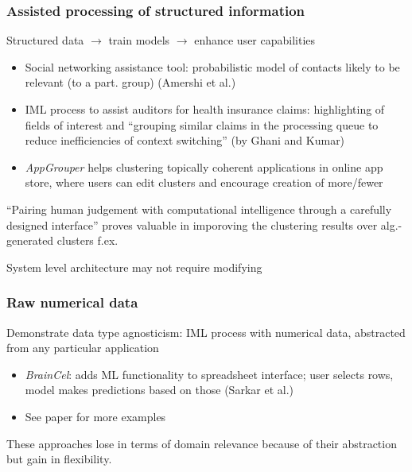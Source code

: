 \documentclass[12pt,a4paper]{article}
\begin{document}
\subsubsection{Assisted processing of structured information}
\begin{description}
\item Structured data $\rightarrow$ train models $\rightarrow$ enhance user capabilities
\end{description}
\begin{itemize}
\item Social networking assistance tool: probabilistic model of contacts likely to be relevant (to a part. group) (Amershi et al.)
\item IML process to assist auditors for health insurance claims: highlighting of fields of interest and ``grouping similar claims in the processing queue to reduce inefficiencies of context switching'' (by Ghani and Kumar)
\item \textit{AppGrouper} helps clustering topically coherent applications in online app store, where users can edit clusters and encourage creation of more/fewer
\end{itemize}
\begin{description}
\item ``Pairing human judgement with computational intelligence through a carefully designed interface'' proves valuable in imporoving the clustering results over alg.-generated clusters f.ex.
\item System level architecture may not require modifying
\end{description}
\subsubsection{Raw numerical data}
\begin{description}
\item Demonstrate data type agnosticism: IML process with numerical data, abstracted from any particular application
\end{description}
\begin{itemize}
\item \textit{BrainCel}: adds ML functionality to spreadsheet interface; user selects rows, model makes predictions based on those (Sarkar et al.)
\item See paper for more examples
\end{itemize}
\begin{description}
\item These approaches lose in terms of domain relevance because of their abstraction but gain in flexibility.
\end{description}
%
\end{document}
